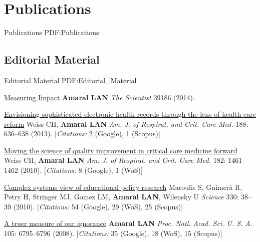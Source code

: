 \section
{Publications}
{Publications}
{PDF:Publications}

\subsection
{Editorial Material}
{Editorial Material}
{PDF:Editorial_Material}

\GapNoBreak
\NumberedItem{\makebox[0.8cm][r]{[11]}}
\href{False}
{Measuring Impact}
\newline
{\textbf{Amaral LAN}}
\newline
\textit{The Scientist}
39186 (2014).
\newline
\Gap
~
\Gap

\NumberedItem{\makebox[0.8cm][r]{[10]}}
\href{/people/amaral/envisioning-sophisticated-electronic-health-records-through-lens-health-care-reform}
{Envisioning sophisticated electronic health records through the lens of health care reform}
\newline
Weiss CH, {\textbf{Amaral LAN}}
\newline
\textit{Am. J. of Respirat. and Crit. Care Med.}
    188:
636--638 (2013).
    [{\em{Citations:}} 2 (Google), 1 (Scopus)]
\newline
\Gap
~
\Gap

\NumberedItem{\makebox[0.8cm][r]{[9]}}
\href{False}
{Moving the science of quality improvement in critical care medicine forward}
\newline
Weiss CH, {\textbf{Amaral LAN}}
\newline
\textit{Am. J. of Respirat. and Crit. Care Med.}
    182:
1461--1462  (2010).
    [{\em{Citations:}} 8 (Google), 1 (WoS)]
\newline
\Gap
~
\Gap

\NumberedItem{\makebox[0.8cm][r]{[8]}}
\href{/people/amaral/complex-systems-view-educational-policy-research}
{Complex systems view of educational policy research}
\newline
Maroulis S, Guimer\`a R, Petry H, Stringer MJ, Gomez LM, {\textbf{Amaral LAN}}, Wilensky U
\newline
\textit{Science}
    330:
38--39 (2010).
    [{\em{Citations:}} 54 (Google), 29 (WoS), 25 (Scopus)]
\newline
\Gap
~
\Gap

\NumberedItem{\makebox[0.8cm][r]{[7]}}
\href{/people/amaral/a-truer-measure-of-our-ignorance}
{A truer measure of our ignorance}
\newline
{\textbf{Amaral LAN}}
\newline
\textit{Proc. Natl. Acad. Sci. U. S. A.}
    105:
6795--6796 (2008).
    [{\em{Citations:}} 35 (Google), 18 (WoS), 15 (Scopus)]
\newline
\Gap
~
\Gap

